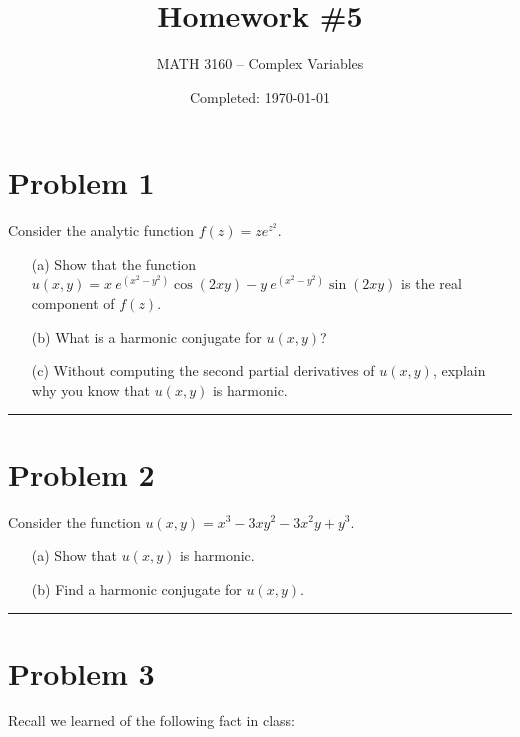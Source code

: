 \documentclass{article}
\title{Homework \#5}
\author{
	MATH 3160 -- Complex Variables\\
	\myauthor
}
\date{Completed: \today}
\let\oldcos\cos
\let\oldsin\sin
\renewcommand{\cos}[1]{\oldcos\left(#1\right)}
\renewcommand{\sin}[1]{\oldsin\left(#1\right)}
\begin{document}
\maketitle %


\section*{Problem 1}
Consider the analytic function $f(z) = z e^{z^2}$.
\begin{enumerate}
	\item [(a)] Show that the function $u(x,y) = x \ e^{(x^2 - y^2)} \cos{2xy} - y \ e^{(x^2 - y^2)} \sin{2xy}$ is the real component of $f(z)$.
	\item [(b)] What is a harmonic conjugate for $u(x,y)$?
	\item [(c)] Without computing the second partial derivatives of $u(x,y)$, explain why you know that $u(x,y)$ is harmonic.
\end{enumerate}

\vspace{.5cm} %

\hrule %

\newpage
\section*{Problem 2}
Consider the function  $u(x,y) = x^3 - 3 x y^2 - 3 x^2 y + y^3$.

\begin{enumerate}
	\item [(a)] Show that $u(x,y)$ is harmonic.
	\item [(b)] Find a harmonic conjugate for $u(x,y)$.
\end{enumerate}


\vspace{.5cm} %

\hrule

\newpage
\section*{Problem 3}
Recall we learned of the following fact in class:
\end{document}
